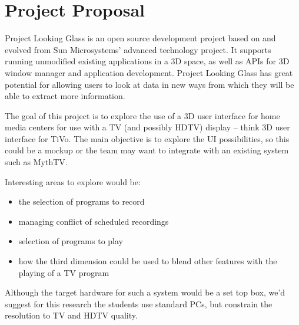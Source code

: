\section{Project Proposal}
Project Looking Glass is an open source development project based on and evolved
from Sun Microsystems' advanced technology project. It supports running unmodified
existing applications in a 3D space, as well as APIs for 3D window manager and
application development. Project Looking Glass has great potential for allowing
users to look at data in new ways from which they will be able to extract more
information.

The goal of this project is to explore the use of a 3D user interface for home media
centers for use with a TV (and possibly HDTV) display -- think 3D user interface for
TiVo. The main objective is to explore the UI possibilities, so this could be a
mockup or the team may want to integrate with an existing system such as MythTV.

\begin{flushleft}
Interesting areas to explore would be:
\begin{itemize}
\item the selection of programs to record
\item managing conflict of scheduled recordings
\item selection of programs to play
\item how the third dimension could be used to blend other features with the playing of a TV program
\end{itemize}
\end{flushleft}

Although the target hardware for such a system would be a set top box, we'd suggest
for this research the students use standard PCs, but constrain the resolution to TV
and HDTV quality.
